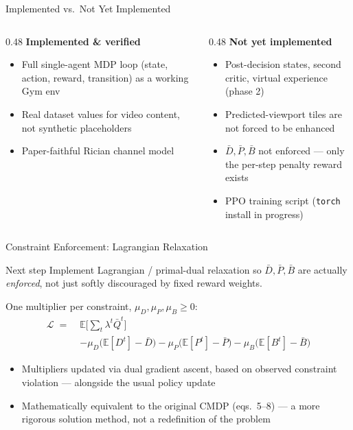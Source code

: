 \documentclass[aspectratio=169]{beamer}
\begin{document}
\begin{frame}{Implemented vs.\ Not Yet Implemented}
  \footnotesize
  \begin{columns}[T]
    \begin{column}{0.48\textwidth}
      \textcolor{green!50!black}{\textbf{Implemented \& verified}}
      \begin{itemize}
        \item Full single-agent MDP loop (state, action, reward, transition) as a working Gym env
        \item Real dataset values for video content, not synthetic placeholders
        \item Paper-faithful Rician channel model
      \end{itemize}
    \end{column}
    \begin{column}{0.48\textwidth}
      \textcolor{red!70!black}{\textbf{Not yet implemented}}
      \begin{itemize}
        \item Post-decision states, second critic, virtual experience (phase 2)
        \item Predicted-viewport tiles are not forced to be enhanced
        \item $\bar D,\bar P,\bar B$ not enforced --- only the per-step penalty reward exists
        \item PPO training script (\texttt{torch} install in progress)
      \end{itemize}
    \end{column}
  \end{columns}
\end{frame}

\begin{frame}{Constraint Enforcement: Lagrangian Relaxation}
  \begin{alertblock}{Next step}
    Implement Lagrangian / primal-dual relaxation so $\bar D,\bar P,\bar B$ are actually \emph{enforced}, not just softly discouraged by fixed reward weights.
  \end{alertblock}

  \vspace{4pt}
  One multiplier per constraint, $\mu_D,\mu_P,\mu_B \ge 0$:
  \begin{align*}
    \mathcal{L} \;=\;& \mathbb{E}\Big[\textstyle\sum_t\lambda^t \bar Q^t\Big] \\
    & - \mu_D\big(\mathbb{E}[D^t]-\bar D\big) - \mu_P\big(\mathbb{E}[P^t]-\bar P\big) - \mu_B\big(\mathbb{E}[B^t]-\bar B\big)
  \end{align*}

  \begin{itemize}
    \item Multipliers updated via dual gradient ascent, based on observed constraint violation --- alongside the usual policy update
    \item Mathematically equivalent to the original CMDP (eqs.\ 5--8) --- a more rigorous solution method, not a redefinition of the problem
  \end{itemize}
\end{frame}
\end{document}
